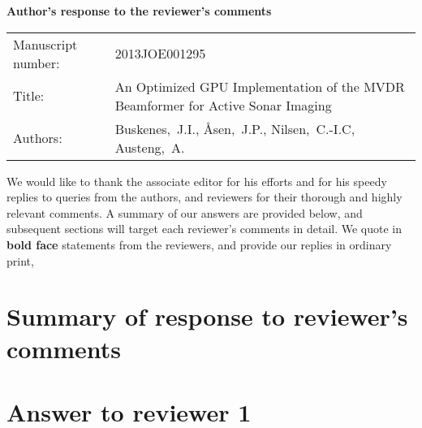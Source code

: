\documentclass[11pt]{article} %
\newcommand\1{\vec 1}
\begin{document}

\begin{center}\Large\bf
Author's response to the reviewer's comments
\end{center}

\begin{center}
\begin{tabular}{l p{.6\linewidth}}\centering
Manuscript number: & 2013JOE001295 \\
Title: & An Optimized GPU Implementation of the MVDR Beamformer for Active Sonar Imaging \\
Authors: & Buskenes,~J.I., \AA{}sen,~J.P., Nilsen,~C.-I.C, Austeng,~A.
\end{tabular}
\end{center}

We would like to thank the associate editor for his efforts and for his speedy replies to queries from the authors, and reviewers for their thorough and highly relevant comments. A summary of our answers are provided below, and subsequent sections will target each reviewer's comments in detail. We quote in \textbf{bold face} statements from the reviewers, and provide our replies in ordinary print, 


\section{Summary of response to reviewer's comments}


\newpage
\section{Answer to reviewer 1}
\end{document}

